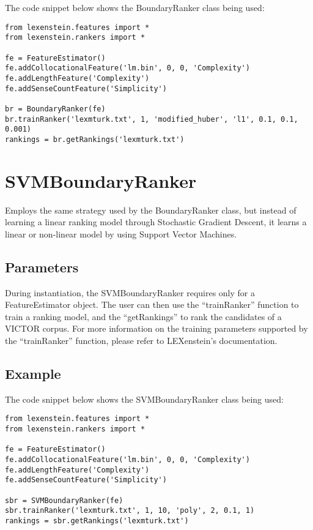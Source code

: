 The code snippet below shows the BoundaryRanker class being used:

\begin{lstlisting}
from lexenstein.features import *
from lexenstein.rankers import *

fe = FeatureEstimator()
fe.addCollocationalFeature('lm.bin', 0, 0, 'Complexity')
fe.addLengthFeature('Complexity')
fe.addSenseCountFeature('Simplicity')

br = BoundaryRanker(fe)
br.trainRanker('lexmturk.txt', 1, 'modified_huber', 'l1', 0.1, 0.1, 0.001)
rankings = br.getRankings('lexmturk.txt')
\end{lstlisting}















\section{SVMBoundaryRanker}

Employs the same strategy used by the BoundaryRanker class, but instead of learning a linear ranking model through Stochastic Gradient Descent, it learns a linear or non-linear model by using Support Vector Machines.

\subsection{Parameters}

During instantiation, the SVMBoundaryRanker requires only for a FeatureEstimator object. The user can then use the ``trainRanker'' function to train a ranking model, and the ``getRankings'' to rank the candidates of a VICTOR corpus. For more information on the training parameters supported by the ``trainRanker'' function, please refer to LEXenstein's documentation.

\subsection{Example}

The code snippet below shows the SVMBoundaryRanker class being used:

\begin{lstlisting}
from lexenstein.features import *
from lexenstein.rankers import *

fe = FeatureEstimator()
fe.addCollocationalFeature('lm.bin', 0, 0, 'Complexity')
fe.addLengthFeature('Complexity')
fe.addSenseCountFeature('Simplicity')

sbr = SVMBoundaryRanker(fe)
sbr.trainRanker('lexmturk.txt', 1, 10, 'poly', 2, 0.1, 1)
rankings = sbr.getRankings('lexmturk.txt')
\end{lstlisting}











